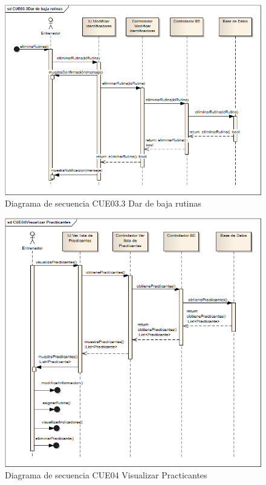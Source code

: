 \begin{figure}[H]
	\begin{center}
		\includegraphics[scale=0.6]{./Figuras/Secuencias/CUE03_3Dar_de_baja_rutinas}
	\end{center}
	\caption{Diagrama de secuencia CUE03.3 Dar de baja rutinas}
	\label{fig:SE_CUE033}
\end{figure}

\begin{figure}[H]
	\begin{center}
		\includegraphics[scale=0.6]{./Figuras/Secuencias/CUE04Visualizar_Practicantes}
	\end{center}
	\caption{Diagrama de secuencia CUE04 Visualizar Practicantes}
	\label{fig:SE_CUE04}
\end{figure}

